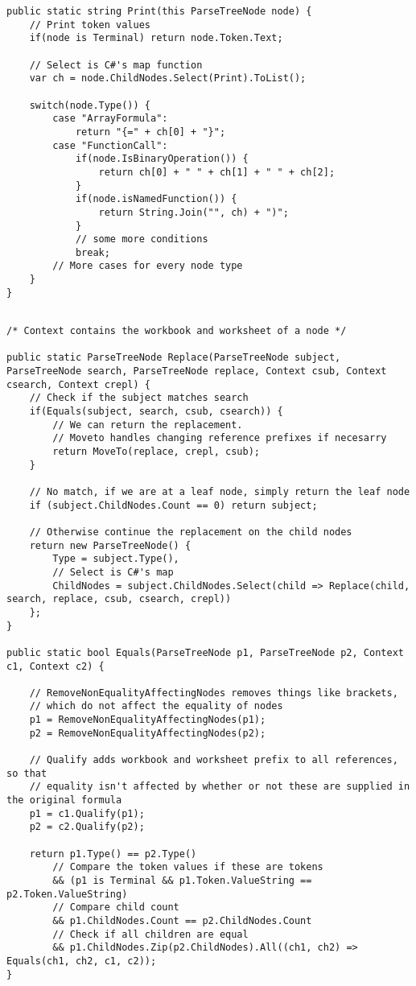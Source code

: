 \lstset{style=sharpc}
\begin{lstlisting}[float,caption={XLParser Print method (simplified)}, label={lst:xlparserprint}]
public static string Print(this ParseTreeNode node) {
	// Print token values
	if(node is Terminal) return node.Token.Text;
	
	// Select is C#'s map function
	var ch = node.ChildNodes.Select(Print).ToList();
	
	switch(node.Type()) {
		case "ArrayFormula":
			return "{=" + ch[0] + "}";
		case "FunctionCall":
			if(node.IsBinaryOperation()) {
				return ch[0] + " " + ch[1] + " " + ch[2];
			}
			if(node.isNamedFunction()) {
				return String.Join("", ch) + ")";
			}
			// some more conditions
			break;
		// More cases for every node type
	}
}
\end{lstlisting}

\lstset{style=sharpc}
\begin{lstlisting}[float,caption={Formula AST replacement (simplified)}, label={lst:astreplace}]

/* Context contains the workbook and worksheet of a node */

public static ParseTreeNode Replace(ParseTreeNode subject, ParseTreeNode search, ParseTreeNode replace, Context csub, Context csearch, Context crepl) {
	// Check if the subject matches search
	if(Equals(subject, search, csub, csearch)) {
		// We can return the replacement.
		// Moveto handles changing reference prefixes if necesarry 
		return MoveTo(replace, crepl, csub);
	}
	
	// No match, if we are at a leaf node, simply return the leaf node
	if (subject.ChildNodes.Count == 0) return subject;
	
	// Otherwise continue the replacement on the child nodes
	return new ParseTreeNode() {
		Type = subject.Type(),
		// Select is C#'s map
		ChildNodes = subject.ChildNodes.Select(child => Replace(child, search, replace, csub, csearch, crepl))
	};
}

public static bool Equals(ParseTreeNode p1, ParseTreeNode p2, Context c1, Context c2) {
	
	// RemoveNonEqualityAffectingNodes removes things like brackets,
	// which do not affect the equality of nodes
	p1 = RemoveNonEqualityAffectingNodes(p1);
	p2 = RemoveNonEqualityAffectingNodes(p2);
	
	// Qualify adds workbook and worksheet prefix to all references, so that
	// equality isn't affected by whether or not these are supplied in the original formula
	p1 = c1.Qualify(p1);
	p2 = c2.Qualify(p2);
	
	return p1.Type() == p2.Type()
		// Compare the token values if these are tokens
	    && (p1 is Terminal && p1.Token.ValueString == p2.Token.ValueString)
	    // Compare child count
	    && p1.ChildNodes.Count == p2.ChildNodes.Count
	    // Check if all children are equal
	    && p1.ChildNodes.Zip(p2.ChildNodes).All((ch1, ch2) => Equals(ch1, ch2, c1, c2));
}
\end{lstlisting}

